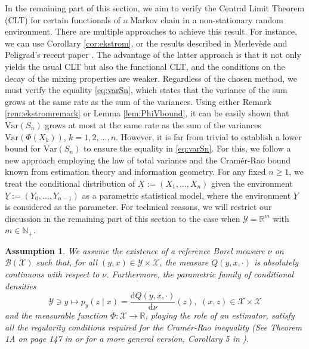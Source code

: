 \documentclass[a4paper,10pt]{article}
\newtheorem{assumption}[theorem]{Assumption}
\newcommand{\N}{\mathbb{N}}
\newcommand{\R}{\mathbb{R}}
\newcommand{\X}{\mathcal{X}}
\newcommand{\Y}{\mathcal{Y}}
\newcommand{\var}{\mathrm{Var}}
\newcommand{\dint}{\mathrm{d}}  %
\newcommand{\ul}[1]{\underline{#1}}
\begin{document}
In the remaining part of this section, we aim to verify the Central Limit Theorem (CLT) for certain functionals of a Markov chain in a non-stationary random environment. There are multiple approaches to achieve this result. For instance, we can use Corollary \ref{cor:ekstrom}, or the results described in Merlev{\`e}de and Peligrad's recent paper \cite{merlevede2020functional}. The advantage of the latter approach is that it not only yields the usual CLT but also the functional CLT, and the conditions on the decay of the mixing properties are weaker. Regardless of the chosen method, we must verify the equality \eqref{eq:varSn}, which states that the variance of the sum grows at the same rate as the sum of the variances. Using either Remark \ref{rem:ekstromremark} or Lemma \ref{lem:PhiVbound}, it can be easily shown that $\var (S_n)$ grows at most at the same rate as the sum of the variances $\var (\Phi (X_k))$, $k=1,2,\ldots,n$. However, it is far from trivial to establish a lower bound for $\var (S_n)$ to ensure the equality in \eqref{eq:varSn}. For this, we 
follow a new approach employing the law of total variance and the Cramér-Rao bound known from estimation theory and information geometry.
For any fixed $n\ge 1$, we treat the conditional distribution of $\ul{X}:=(X_1,\ldots,X_n)$ given the environment $\ul{Y}:=(Y_0,\ldots,Y_{n-1})$ as a parametric statistical model, where the environment $\ul{Y}$ is considered as the parameter.
For technical reasons, we will restrict our discussion in the remaining part of this section to the case when $\Y = \R^m$ with $m \in \N_{+}$.
\begin{assumption}\label{as:Fisher}
	We assume the existence of a reference Borel measure $\nu$ on $\mathcal{B}(\X)$ such that, for all $(y,x) \in \Y \times \X$, the measure $Q(y,x,\cdot)$ is absolutely continuous with respect to $\nu$. Furthermore, the parametric family of conditional densities
	$$
	\Y\ni y\mapsto p_y(z\mid x)=\frac{\dint Q(y,x,\cdot)}{\dint \nu}(z),\,\, (x,z)\in\X\times\X
	$$
	and the measurable function $\Phi:\X\to\R$, playing the role of an estimator,
	satisfy all the regularity conditions required for the Cramér-Rao inequality (See Theorem 1A on page 147 in \cite{BorovkovCramer} or for a more general version, Corollary 5 in \cite{BercherCramer}).
\end{assumption}
\end{document}
